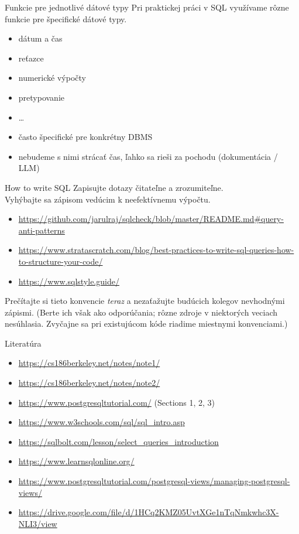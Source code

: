 \documentclass[12pt]{beamer}
\begin{document}
\begin{frame}[fragile]{Funkcie pre jednotlivé dátové typy}
Pri praktickej práci v SQL využívame rôzne funkcie pre špecifické dátové typy.
\begin{itemize}
\item dátum a čas
\item reťazce
\item numerické výpočty
\item pretypovanie
\item \dots
\item často špecifické pre konkrétny DBMS
\item nebudeme s nimi strácať čas, ľahko sa rieši za pochodu (dokumentácia / LLM)
\end{itemize}
\end{frame}


\begin{frame}[fragile]{How to write SQL}
Zapisujte dotazy čitateľne a zrozumiteľne.\\
Vyhýbajte sa zápisom vedúcim k neefektívnemu výpočtu.\\[3mm]
\begin{itemize}
\item {\scriptsize\url{https://github.com/jarulraj/sqlcheck/blob/master/README.md#query-anti-patterns}}
\item {\scriptsize\url{https://www.stratascratch.com/blog/best-practices-to-write-sql-queries-how-to-structure-your-code/}}
\item {\scriptsize\url{https://www.sqlstyle.guide/}}
\end{itemize}
\vspace*{3mm}
Prečítajte si tieto konvencie \emph{teraz} a nezaťažujte budúcich kolegov nevhodnými zápismi.
(Berte ich však ako odporúčania; rôzne zdroje v niektorých veciach nesúhlasia. Zvyčajne sa pri existujúcom kóde riadime miestnymi konvenciami.)
\end{frame}


\begin{frame}{Literatúra}
\begin{itemize}
\item {\scriptsize\url{https://cs186berkeley.net/notes/note1/}}
\item {\scriptsize\url{https://cs186berkeley.net/notes/note2/}}
\item {\scriptsize\url{https://www.postgresqltutorial.com/} (Sections 1, 2, 3)}
\item {\scriptsize\url{https://www.w3schools.com/sql/sql_intro.asp}}
\item {\scriptsize\url{https://sqlbolt.com/lesson/select_queries_introduction}}
\item {\scriptsize\url{https://www.learnsqlonline.org/}}
\item {\scriptsize\url{https://www.postgresqltutorial.com/postgresql-views/managing-postgresql-views/}}
\item {\scriptsize\url{https://drive.google.com/file/d/1HCq2KMZ05UvtXGe1nTqNmkwhc3X-NLI3/view}}
\end{itemize}
\end{frame}
\end{document}
